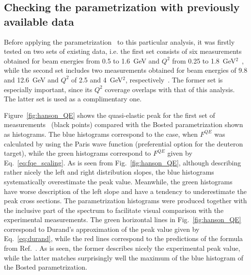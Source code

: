 \subsection*{Checking the parametrization with previously available data}
\label{sect:prev_data}

Before applying the parametrization~\cite{Bosted_fit,Bosted:2007xd} to this particular analysis, it was firstly tested on two sets of existing data, i.e. the first set consists of six measurements obtained for beam energies from 0.5 to 1.6~GeV and $Q^{2}$ from 0.25 to 1.8~GeV$^2$~\cite{Hanson:1973vf}, while the second set includes two measurements obtained for beam energies of 9.8 and 12.6~GeV and $Q^{2}$ of 2.5 and 4~GeV$^2$, respectively~\cite{Rock:1991jy,Rock_SLAC}. The former set is especially important, since its $Q^{2}$ coverage overlaps with that of this analysis. The latter set is used as a complimentary one.

Figure~\ref{fig:hanson_QE} shows the quasi-elastic peak for the first set of measurements~\cite{Hanson:1973vf} (black points) compared with the Bosted parametrization shown as histograms. The blue histograms correspond to the case, when $F^{QE}$ was calculated by using the Paris wave function (preferential option for the deuteron target), while the green histograms correspond to $F^{QE}$ given by Eq.~\eqref{eq:fqe_scaling}. As is seen from Fig.~\ref{fig:hanson_QE}, although describing rather nicely the left and right distribution slopes, the blue histograms systematically overestimate the peak value. Meanwhile, the green histograms have worse description of the left slope and have a tendency to underestimate the peak cross sections. The parametrization histograms were produced together with the inclusive part of the spectrum to facilitate visual comparison with the experimental measurements. The green horizontal lines in Fig.~\ref{fig:hanson_QE} correspond to Durand's approximation of the peak value given by Eq.~\eqref{eq:durand}, while the red lines correspond to the predictions of the formula from Ref.~\cite{Kocevar:1967}. As is seen, the former describes nicely the experimental peak value, while the latter matches surprisingly well the maximum of the blue histogram of the Bosted parametrization.

